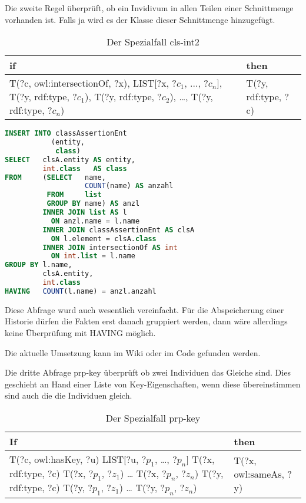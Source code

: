 Die zweite Regel überprüft, ob ein Invidivum in allen Teilen einer Schnittmenge vorhanden ist. Falls ja wird es der Klasse dieser Schnittmenge hinzugefügt.
\begin{table}[htb]
\begin{center}
	\begin{tabular}{m{6cm}|m{3.5cm}}
	if & then \\ \hline
	T(?c, owl:intersectionOf, ?x),\newline
	LIST[?x, ?$c_1$, ..., ?$c_n$],\newline
	T(?y, rdf:type, ?$c_1$),\newline
	T(?y, rdf:type, ?$c_2$),\newline
	\ldots,\newline
	T(?y, rdf:type, ?$c_n$) & T(?y, rdf:type, ?c) 	 
	\end{tabular}
\end{center}
	\caption{Der Spezialfall cls-int2}
	\label{rule-cls-int2}
\end{table}


\begin{lstlisting}[language=SQL]
INSERT INTO classAssertionEnt
           (entity,
            class)
SELECT   clsA.entity AS entity,
         int.class   AS class
FROM     (SELECT   name,
                   COUNT(name) AS anzahl
          FROM     list
          GROUP BY name) AS anzl
         INNER JOIN list AS l
           ON anzl.name = l.name
         INNER JOIN classAssertionEnt AS clsA
           ON l.element = clsA.class
         INNER JOIN intersectionOf AS int
           ON int.list = l.name
GROUP BY l.name,
         clsA.entity,
         int.class
HAVING   COUNT(l.name) = anzl.anzahl
\end{lstlisting}

Diese Abfrage wurd auch wesentlich vereinfacht. Für die Abspeicherung einer Historie dürfen die Fakten erst danach gruppiert werden, dann wäre allerdings keine Überprüfung mit HAVING möglich.

Die aktuelle Umsetzung kann im Wiki oder im Code gefunden werden.

Die dritte Abfrage prp-key überprüft ob zwei Individuen das Gleiche sind. Dies geschieht an Hand einer Liste  von Key-Eigenschaften, wenn diese übereinstimmen sind auch die die Individuen gleich.
\begin{table}[htb]
\begin{center}
	\begin{tabular}{l|l}
	If & then \\ \hline
	T(?c, owl:hasKey, ?u)
	LIST[?u, ?$p_1$, \ldots, ?$p_n$]
	T(?x, rdf:type, ?c)
	T(?x, ?$p_1$, ?$z_1$)
	\ldots
	T(?x, ?$p_n$, ?$z_n$)
	T(?y, rdf:type, ?c)
	T(?y, ?$p_1$, ?$z_1$)
	\ldots
	T(?y, ?$p_n$, ?$z_n$) & T(?x, owl:sameAs, ?y)
	\end{tabular}
\end{center}
	\caption{Der Spezialfall prp-key}
	\label{rule-prp-key}
\end{table}


